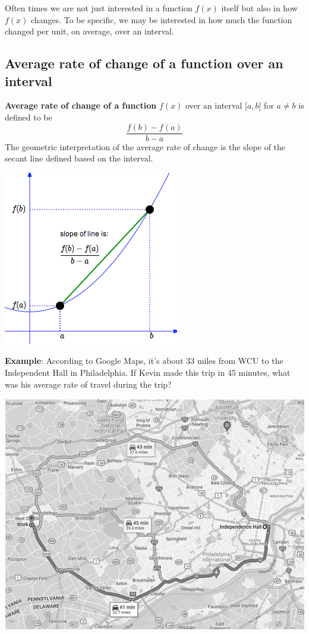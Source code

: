 \documentclass[
]{book}
\begin{document}
Often times we are not just interested in a function \(f(x)\) itself but also in how \(f(x)\) changes. To be specific, we may be interested in how much the function changed per unit, on average, over an interval.

\hypertarget{average-rate-of-change-of-a-function-over-an-interval-2}{%
\subsection{Average rate of change of a function over an interval}\label{average-rate-of-change-of-a-function-over-an-interval-2}}

\textbf{Average rate of change of a function} \(f(x)\) over an interval {[}\(a, b\){]} for \(a \ne b\) is defined to be
\[
\frac{f(b)-f(a)}{b-a}
\]
The geometric interpretation of the average rate of change is the slope of the secant line defined based on the interval.

\begin{center}\includegraphics[width=0.45\linewidth]{img02/w01note16-SecantLineSlope} \end{center}

\textbf{Example}: According to Google Maps, it's about 33 miles from WCU to the Independent Hall in Philadelphia. If Kevin made this trip in 45 minutes, what was his average rate of travel during the trip?

\begin{center}\includegraphics[width=0.65\linewidth]{img02/w01note17-RateChangeDistance} \end{center}
\end{document}

